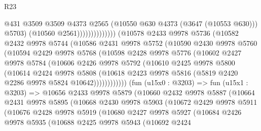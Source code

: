 \begin{lexlean}{R23}
\begin{coremodule}
                                    @431
                                    @3509
                                    @3509
                                    @4373
                                    @2565
                                    (@10550 @630 @4373 (@3647 (@10553 @630)))
                                    @5703)
                                  (@10560 @2561))))))))))))))
        (@10578
          @2433
          @9978
          @5736
          (@10582
            @2432
            @9978
            @5744
            (@10586
              @2431
              @9978
              @5752
              (@10590
                @2430
                @9978
                @5760
                (@10594
                  @2429
                  @9978
                  @5768
                  (@10598
                    @2428
                    @9978
                    @5776
                    (@10602
                      @2427
                      @9978
                      @5784
                      (@10606
                        @2426
                        @9978
                        @5792
                        (@10610
                          @2425
                          @9978
                          @5800
                          (@10614
                            @2424
                            @9978
                            @5808
                            (@10618
                              @2423
                              @9978
                              @5816
                              (@5819 @2420 @2286 @9978 @5824 @10642))))))))))))
        (fun (u15x0 : @3203) =>
        fun (u15x1 : @3203) =>
        @10656
          @2433
          @9978
          @5879
          (@10660
            @2432
            @9978
            @5887
            (@10664
              @2431
              @9978
              @5895
              (@10668
                @2430
                @9978
                @5903
                (@10672
                  @2429
                  @9978
                  @5911
                  (@10676
                    @2428
                    @9978
                    @5919
                    (@10680
                      @2427
                      @9978
                      @5927
                      (@10684
                        @2426
                        @9978
                        @5935
                        (@10688
                          @2425
                          @9978
                          @5943
                          (@10692
                            @2424

\end{coremodule}
\end{lexlean}
